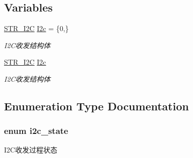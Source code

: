\subsection*{\-Variables}
\begin{DoxyCompactItemize}
\item 
\hypertarget{group___i2_c_ga74d3522c7f760f53f9a042059dae0488}{\hyperlink{struct_s_t_r___i2_c}{\-S\-T\-R\-\_\-\-I2\-C} \hyperlink{group___i2_c_ga74d3522c7f760f53f9a042059dae0488}{\-I2c} = \{0,\}}\label{group___i2_c_ga74d3522c7f760f53f9a042059dae0488}

\begin{DoxyCompactList}\small\item\em \-I2\-C收发结构体 \end{DoxyCompactList}\item 
\hypertarget{group___i2_c_ga74d3522c7f760f53f9a042059dae0488}{\hyperlink{struct_s_t_r___i2_c}{\-S\-T\-R\-\_\-\-I2\-C} \hyperlink{group___i2_c_ga74d3522c7f760f53f9a042059dae0488}{\-I2c}}\label{group___i2_c_ga74d3522c7f760f53f9a042059dae0488}

\begin{DoxyCompactList}\small\item\em \-I2\-C收发结构体 \end{DoxyCompactList}\end{DoxyCompactItemize}


\subsection{\-Enumeration \-Type \-Documentation}
\hypertarget{group___i2_c_ga3acd3f8324118cb8c44f79b0fa24190a}{
\subsubsection[{i2c\-\_\-state}]{\setlength{\rightskip}{0pt plus 5cm}enum {\bf i2c\-\_\-state}}}\label{group___i2_c_ga3acd3f8324118cb8c44f79b0fa24190a}


\-I2\-C收发过程状态 

